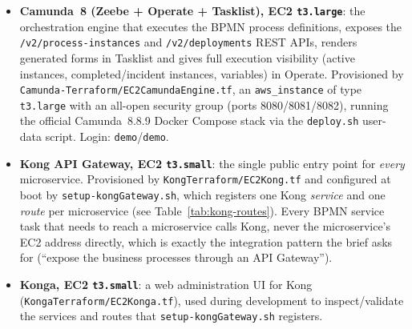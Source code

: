 \documentclass[11pt,a4paper]{article}
\begin{document}
\begin{itemize} \item \textbf{Camunda~8 (Zeebe + Operate + Tasklist), EC2 \texttt{t3.large}}: the orchestration engine that executes the BPMN process definitions, exposes the \texttt{/v2/process-instances} and \texttt{/v2/deployments} REST APIs, renders generated forms in Tasklist and gives full execution visibility (active instances, completed/incident instances, variables) in Operate. Provisioned by \texttt{Camunda-Terraform/EC2CamundaEngine.tf}, an \texttt{aws\_instance} of type \texttt{t3.large} with an all-open security group (ports 8080/8081/8082), running the official Camunda~8.8.9 Docker Compose stack via the \texttt{deploy.sh} user-data script. Login: \texttt{demo}/\texttt{demo}. \item \textbf{Kong API Gateway, EC2 \texttt{t3.small}}: the single public entry point for \emph{every} microservice. Provisioned by \texttt{KongTerraform/EC2Kong.tf} and configured at boot by \texttt{setup-kongGateway.sh}, which registers one Kong \emph{service} and one \emph{route} per microservice (see Table~\ref{tab:kong-routes}). Every BPMN service task that needs to reach a microservice calls Kong, never the microservice's EC2 address directly, which is exactly the integration pattern the brief asks for (``expose the business processes through an API Gateway''). \item \textbf{Konga, EC2 \texttt{t3.small}}: a web administration UI for Kong (\texttt{KongaTerraform/EC2Konga.tf}), used during development to inspect/validate the services and routes that \texttt{setup-kongGateway.sh} registers.
\end{itemize}
 
\end{document}
